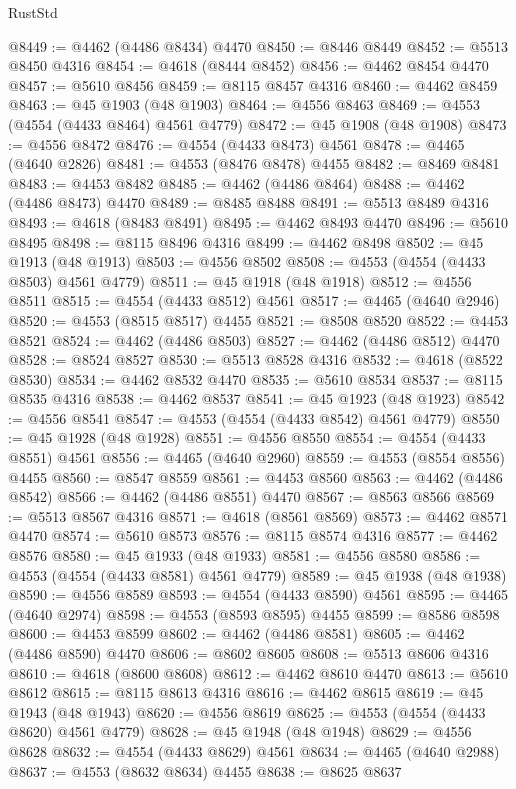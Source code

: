 \begin{lexlean}{RustStd}
\begin{coremodule}
@8449 := @4462 (@4486 @8434) @4470
@8450 := @8446 @8449
@8452 := @5513 @8450 @4316
@8454 := @4618 (@8444 @8452)
@8456 := @4462 @8454 @4470
@8457 := @5610 @8456
@8459 := @8115 @8457 @4316
@8460 := @4462 @8459
@8463 := @45 @1903 (@48 @1903)
@8464 := @4556 @8463
@8469 := @4553 (@4554 (@4433 @8464) @4561 @4779)
@8472 := @45 @1908 (@48 @1908)
@8473 := @4556 @8472
@8476 := @4554 (@4433 @8473) @4561
@8478 := @4465 (@4640 @2826)
@8481 := @4553 (@8476 @8478) @4455
@8482 := @8469 @8481
@8483 := @4453 @8482
@8485 := @4462 (@4486 @8464)
@8488 := @4462 (@4486 @8473) @4470
@8489 := @8485 @8488
@8491 := @5513 @8489 @4316
@8493 := @4618 (@8483 @8491)
@8495 := @4462 @8493 @4470
@8496 := @5610 @8495
@8498 := @8115 @8496 @4316
@8499 := @4462 @8498
@8502 := @45 @1913 (@48 @1913)
@8503 := @4556 @8502
@8508 := @4553 (@4554 (@4433 @8503) @4561 @4779)
@8511 := @45 @1918 (@48 @1918)
@8512 := @4556 @8511
@8515 := @4554 (@4433 @8512) @4561
@8517 := @4465 (@4640 @2946)
@8520 := @4553 (@8515 @8517) @4455
@8521 := @8508 @8520
@8522 := @4453 @8521
@8524 := @4462 (@4486 @8503)
@8527 := @4462 (@4486 @8512) @4470
@8528 := @8524 @8527
@8530 := @5513 @8528 @4316
@8532 := @4618 (@8522 @8530)
@8534 := @4462 @8532 @4470
@8535 := @5610 @8534
@8537 := @8115 @8535 @4316
@8538 := @4462 @8537
@8541 := @45 @1923 (@48 @1923)
@8542 := @4556 @8541
@8547 := @4553 (@4554 (@4433 @8542) @4561 @4779)
@8550 := @45 @1928 (@48 @1928)
@8551 := @4556 @8550
@8554 := @4554 (@4433 @8551) @4561
@8556 := @4465 (@4640 @2960)
@8559 := @4553 (@8554 @8556) @4455
@8560 := @8547 @8559
@8561 := @4453 @8560
@8563 := @4462 (@4486 @8542)
@8566 := @4462 (@4486 @8551) @4470
@8567 := @8563 @8566
@8569 := @5513 @8567 @4316
@8571 := @4618 (@8561 @8569)
@8573 := @4462 @8571 @4470
@8574 := @5610 @8573
@8576 := @8115 @8574 @4316
@8577 := @4462 @8576
@8580 := @45 @1933 (@48 @1933)
@8581 := @4556 @8580
@8586 := @4553 (@4554 (@4433 @8581) @4561 @4779)
@8589 := @45 @1938 (@48 @1938)
@8590 := @4556 @8589
@8593 := @4554 (@4433 @8590) @4561
@8595 := @4465 (@4640 @2974)
@8598 := @4553 (@8593 @8595) @4455
@8599 := @8586 @8598
@8600 := @4453 @8599
@8602 := @4462 (@4486 @8581)
@8605 := @4462 (@4486 @8590) @4470
@8606 := @8602 @8605
@8608 := @5513 @8606 @4316
@8610 := @4618 (@8600 @8608)
@8612 := @4462 @8610 @4470
@8613 := @5610 @8612
@8615 := @8115 @8613 @4316
@8616 := @4462 @8615
@8619 := @45 @1943 (@48 @1943)
@8620 := @4556 @8619
@8625 := @4553 (@4554 (@4433 @8620) @4561 @4779)
@8628 := @45 @1948 (@48 @1948)
@8629 := @4556 @8628
@8632 := @4554 (@4433 @8629) @4561
@8634 := @4465 (@4640 @2988)
@8637 := @4553 (@8632 @8634) @4455
@8638 := @8625 @8637

\end{coremodule}
\end{lexlean}
